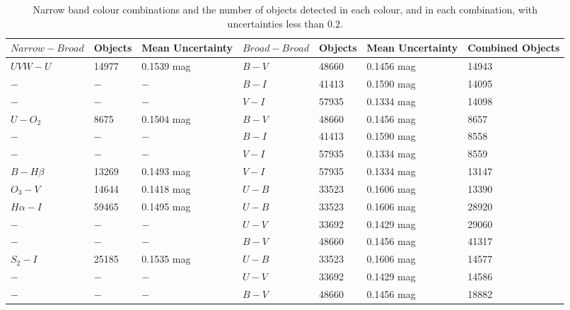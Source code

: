 \begin{table}
\centering
\caption{Narrow band colour combinations and the number of objects detected in each colour, and in each combination, with uncertainties less than $0.2$.}
\label{tab:BBcolours}
\begin{tabular}{lllllll}
\hline\hline
$Narrow - Broad$ & Objects & Mean Uncertainty & $Broad - Broad$ & Objects & Mean Uncertainty & Combined Objects \\
\hline
$UVW - U$ &  14977 & 0.1539 mag & $B - V$ &  48660 & 0.1456 mag & 14943 \\
$ - $ & $ - $ & $ - $ & $B - I$ &  41413 & 0.1590 mag & 14095 \\
$ - $ & $ - $ & $ - $ & $V - I$ &  57935 & 0.1334 mag & 14098 \\
\hline
$U - O_{2}$ & 8675 & 0.1504 mag & $B - V$ &  48660 & 0.1456 mag & 8657 \\
$ - $ & $ - $ & $ - $ & $B - I$ &  41413 & 0.1590 mag & 8558 \\
$ - $ & $ - $ & $ - $ & $V - I$ &  57935 & 0.1334 mag & 8559 \\
\hline
$B - H\beta$ & 13269 & 0.1493 mag & $V - I$ &  57935 & 0.1334 mag & 13147 \\
\hline
$O_{3} - V$ & 14644 & 0.1418 mag & $U - B$ &  33523 & 0.1606 mag & 13390 \\
\hline
$H\alpha - I$ & 59465 & 0.1495 mag & $U - B$ &  33523 & 0.1606 mag & 28920 \\
$ - $ & $ - $ & $ - $ & $U - V$ &  33692 & 0.1429 mag & 29060 \\
$ - $ & $ - $ & $ - $ & $B - V$ &  48660 & 0.1456 mag & 41317 \\
\hline
$S_{2} - I$ & 25185 & 0.1535 mag & $U - B$ &  33523 & 0.1606 mag & 14577 \\
$ - $ & $ - $ & $ - $ & $U - V$ &  33692 & 0.1429 mag & 14586 \\
$ - $ & $ - $ & $ - $ & $B - V$ &  48660 & 0.1456 mag & 18882 \\
\hline
\end{tabular}
\end{table}

